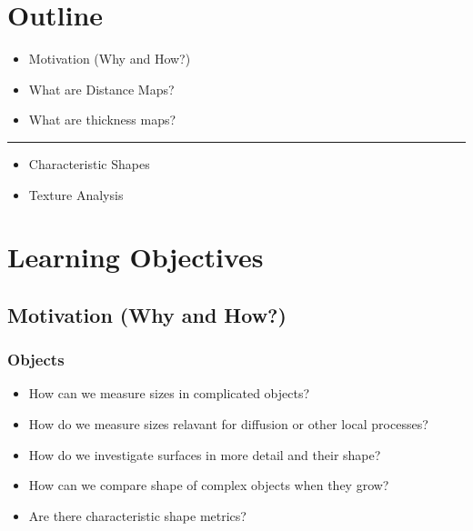 \documentclass[letterpaper,10pt,english]{sphinxmanual}
\begin{document}
\section{Outline}
\label{\detokenize{06-AdvancedShapeAndTexture:outline}}\begin{itemize}
\item {} 
\sphinxAtStartPar
Motivation (Why and How?)

\item {} 
\sphinxAtStartPar
What are Distance Maps?

\item {} 
\sphinxAtStartPar
What are thickness maps?

\end{itemize}


\bigskip\hrule\bigskip

\begin{itemize}
\item {} 
\sphinxAtStartPar
Characteristic Shapes

\item {} 
\sphinxAtStartPar
Texture Analysis

\end{itemize}


\section{Learning Objectives}
\label{\detokenize{06-AdvancedShapeAndTexture:learning-objectives}}

\subsection{Motivation (Why and How?)}
\label{\detokenize{06-AdvancedShapeAndTexture:motivation-why-and-how}}

\subsubsection{Objects}
\label{\detokenize{06-AdvancedShapeAndTexture:objects}}\begin{itemize}
\item {} 
\sphinxAtStartPar
How can we measure sizes in complicated objects?

\item {} 
\sphinxAtStartPar
How do we measure sizes relavant for diffusion or other local processes?

\item {} 
\sphinxAtStartPar
How do we investigate surfaces in more detail and their shape?

\item {} 
\sphinxAtStartPar
How can we compare shape of complex objects when they grow?

\item {} 
\sphinxAtStartPar
Are there characteristic shape metrics?

\end{itemize}
\end{document}
